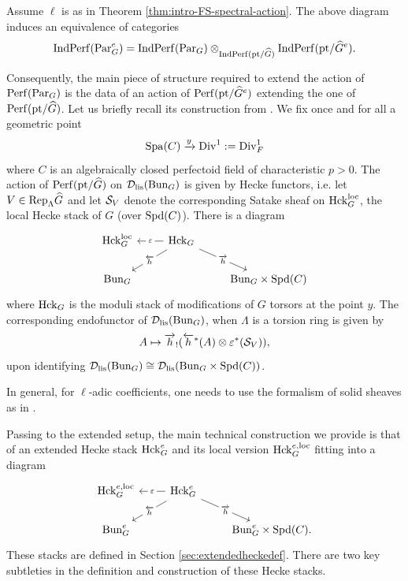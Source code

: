 \begin{thm}
    Assume $\ell$ is as in Theorem \ref{thm:intro-FS-spectral-action}.
    The above diagram induces an equivalence of categories 
    $$\mathrm{Ind}\mathrm{Perf}(\mathrm{Par}_G^e) = \mathrm{Ind}\mathrm{Perf}(\mathrm{Par}_G) \otimes_{\mathrm{Ind}\mathrm{Perf}(\mathrm{pt}/\widehat{G})} \mathrm{Ind}\mathrm{Perf}(\mathrm{pt}/\widehat{G}^e).$$
\end{thm}

Consequently, the main piece of structure required to extend the action of $\mathrm{Perf}(\mathrm{Par}_G)$ is the data of an action of $\mathrm{Perf}(\mathrm{pt}/\widehat{G}^{e})$ extending the one of $\mathrm{Perf}(\mathrm{pt}/\widehat{G})$. Let us briefly recall its construction from \cite{Geometrization}. We fix once and for all a geometric point 
$$\mathrm{Spa}(C) \xrightarrow{y} \mathrm{Div}^{1}:=\mathrm{Div}^1_F$$
where $C$ is an algebraically closed perfectoid field of characteristic $p > 0$. The action of $\mathrm{Perf}(\mathrm{pt}/\widehat{G})$ on $\mathcal{D}_{\mathrm{lis}}(\mathrm{Bun}_G)$ is given by Hecke functors, i.e. let $V \in \mathrm{Rep}_{\Lambda}\widehat{G}$ and let $\mathcal{S}_{V}$ denote the corresponding Satake sheaf on $\mathrm{Hck}^{\mathrm{loc}}_G$, the local Hecke stack of $G$ (over $\mathrm{Spd}(C)$). There is a diagram 
\[\begin{tikzcd}
	{\Hk^{\loc}_G} & {\Hk_G} & \\
	{\Bun_G} && {\Bun_G \times \Spd(C)}
	\arrow["\varepsilon"{description}, from=1-2, to=1-1]
	\arrow["{\overleftarrow{h}}"{description}, from=1-2, to=2-1]
	\arrow["{\overrightarrow{h}}"{description}, from=1-2, to=2-3]
\end{tikzcd}\]
where $\mathrm{Hck}_G$ is the moduli stack of modifications of $G$ torsors at the point $y$. The corresponding endofunctor of $\mathcal{D}_{\mathrm{lis}}(\mathrm{Bun}_G)$, when $\Lambda$ is a torsion ring is given by 
\begin{equation}\label{eq:hecke-operator-intro}
    A \mapsto \overrightarrow{h}_{!}(\overleftarrow{h}^*(A) \otimes \varepsilon^*(\mathcal{S}_V)),
\end{equation}
upon identifying $\mathcal{D}_{\mathrm{lis}}(\mathrm{Bun}_G) \cong \mathcal{D}_{\mathrm{lis}}(\mathrm{Bun}_G \times \mathrm{Spd}(C))$. 

In general, for $\ell$-adic coefficients, one needs to use the formalism of solid sheaves as in \cite[Section IX]{Geometrization}.

Passing to the extended setup, the main technical construction we provide is that of an extended Hecke stack $\mathrm{Hck}^e_G$ and its local version $\mathrm{Hck}^{e,\mathrm{loc}}_{G}$ fitting into a diagram 
\[\begin{tikzcd}
	{\Hk^{e,\loc}_G} & {\Hk_G^e} & \\
	{\Bun_G^e} && {\Bun_G^e \times \Spd(C).}
	\arrow["\varepsilon"{description}, from=1-2, to=1-1]
	\arrow["{\overleftarrow{h}}"{description}, from=1-2, to=2-1]
	\arrow["{\overrightarrow{h}}"{description}, from=1-2, to=2-3]
\end{tikzcd}\]
These stacks are defined in Section \ref{sec:extendedheckedef}. 
There are two key subtleties in the definition and construction of these Hecke stacks.

